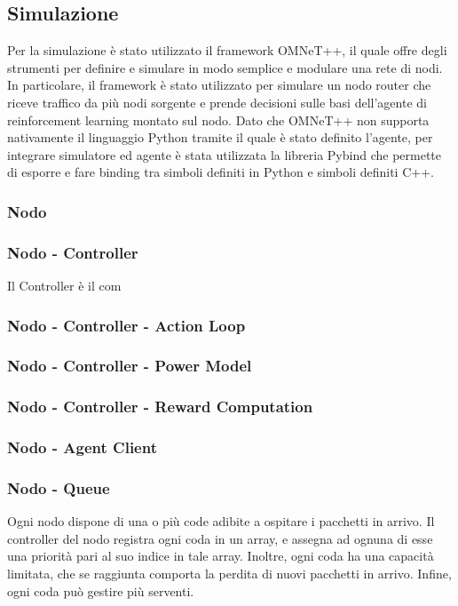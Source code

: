 \documentclass[conference]{IEEEtran}
\begin{document}
\subsection{Simulazione}
Per la simulazione è stato utilizzato il framework OMNeT++, il quale offre degli strumenti per definire e simulare in modo semplice e modulare una rete di nodi. In particolare, il framework è stato utilizzato per simulare un nodo router che riceve traffico da più nodi sorgente e prende decisioni sulle basi dell'agente di reinforcement learning montato sul nodo. Dato che OMNeT++ non supporta nativamente il linguaggio Python tramite il quale è stato definito l'agente, per integrare simulatore ed agente è stata utilizzata la libreria Pybind  che permette di esporre e fare binding tra simboli definiti in Python e simboli definiti C++. 

\subsubsection{Nodo}

\subsubsection{Nodo - Controller}
Il Controller è il com
\subsubsection{Nodo - Controller - Action Loop}
\subsubsection{Nodo - Controller - Power Model}
\subsubsection{Nodo - Controller - Reward Computation}

\subsubsection{Nodo - Agent Client}

\subsubsection{Nodo - Queue}
Ogni nodo dispone di una o più code adibite a ospitare i pacchetti in arrivo.
Il controller del nodo registra ogni coda in un array, e assegna ad ognuna di esse una
priorità pari al suo indice in tale array. Inoltre, ogni coda ha una capacità limitata,
che se raggiunta comporta la perdita di nuovi pacchetti in arrivo. Infine, ogni coda
può gestire più serventi.
\end{document}
